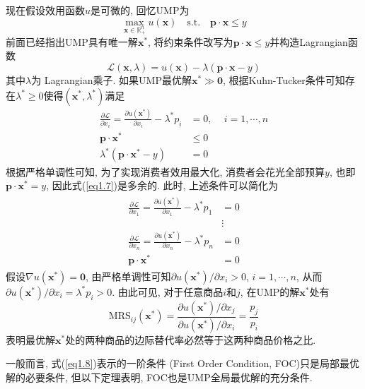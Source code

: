\documentclass[cn, 12pt, math=mtpro2, bibstyle=apa, blue]{elegantbook}
\newcommand{\R}{\mathbb{R}}
\newcommand{\p}{\mathbf{p}}
\newcommand{\x}{\mathbf{x}}
\begin{document}
现在假设效用函数$u$是可微的, 回忆UMP为
\begin{equation}\label{eq1.4}
  \max_{\x\in\R^n_+} u(\x)\quad \text{s.t.}\quad \p\cdot\x\leq y
\end{equation}
前面已经指出UMP具有唯一解$\x^\ast$, 将约束条件改写为$\p\cdot\x\leq y$并构造Lagrangian函数
$$\mathcal{L}(\x,\lambda)=u(\x)-\lambda(\p\cdot\x-y)$$
其中$\lambda$为 Lagrangian乘子. 如果UMP最优解$\x^\ast\gg\mathbf{0}$, 根据Kuhn-Tucker条件可知存在$\lambda^\ast\ge0$使得$(\x^\ast,\lambda^\ast)$满足
\begin{align}
\frac{\partial\mathcal{L}}{\partial x_i}=\frac{\partial u(\x^\ast)}{\partial x_i}-\lambda^\ast p_i&=0,\,\quad i=1,\cdots, n \label{eq1.5} \\
\p\cdot\x^\ast&\leq 0  \label{eq1.6} \\
\lambda^\ast(\p\cdot\x^\ast-y)&=0 \label{eq1.7}
\end{align}
根据严格单调性可知, 为了实现消费者效用最大化, 消费者会花光全部预算$y$, 也即$\p\cdot\x^\ast=y$, 因此式(\ref{eq1.7})是多余的. 此时, 上述条件可以简化为
\begin{align}
\begin{split}
\frac{\partial\mathcal{L}}{\partial x_1}=\frac{\partial u(\x^\ast)}{\partial x_1}-\lambda^\ast p_1&=0  \\
&\vdots  \\
\frac{\partial\mathcal{L}}{\partial x_n}=\frac{\partial u(\x^\ast)}{\partial x_n}-\lambda^\ast p_n&=0 \\
\p\cdot\x^\ast&=0
\end{split}
\label{eq1.8}
\end{align}
假设$\nabla u(\x^\ast)=\mathbf{0}$, 由严格单调性可知$\partial u(\x^\ast)/\partial x_i>0$, $i=1,\cdots,n$, 从而$\partial u(\x^\ast)/\partial x_i=\lambda^\ast p_i>0$. 由此可见, 对于任意商品$i$和$j$, 在UMP的解$\x^\ast$处有
\begin{equation}\label{eq1.9}
  \text{MRS}_{ij}(\x^\ast)=\frac{\partial u(\x^\ast)/\partial x_j}{\partial u(\x^\ast)/\partial x_i}=\frac{p_j}{p_i}
\end{equation}
表明最优解$\x^\ast$处的两种商品的边际替代率必然等于这两种商品价格之比.

一般而言, 式(\ref{eq1.8})表示的一阶条件 (First Order Condition, FOC)只是局部最优解的必要条件, 但以下定理表明, FOC也是UMP全局最优解的充分条件.
\end{document}
